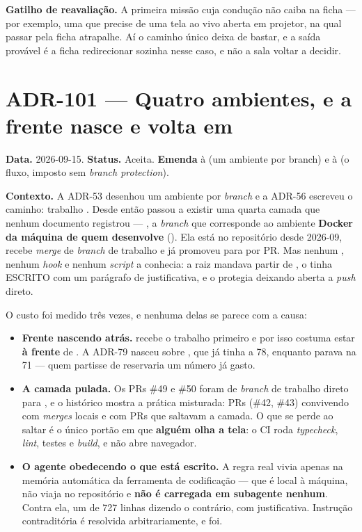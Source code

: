 \textbf{Gatilho de reavaliação.} A primeira missão cuja condução não caiba na
ficha --- por exemplo, uma que precise de uma tela ao vivo aberta em projetor, na
qual passar pela ficha atrapalhe. Aí o caminho único deixa de bastar, e a saída
provável é a ficha redirecionar sozinha nesse caso, e não a sala voltar a
decidir.


\section{ADR-101 --- Quatro ambientes, e a frente nasce e volta em }
\label{adr:quatro-ambientes}

\textbf{Data.} 2026-09-15. \textbf{Status.} Aceita.
\textbf{Emenda} à  (um ambiente por branch) e à 
(o fluxo, imposto sem \emph{branch protection}).

\textbf{Contexto.} A ADR-53 desenhou um ambiente por \emph{branch} e a ADR-56
escreveu o caminho: trabalho \seta{}  \seta{}  \seta{}
. Desde então passou a existir uma quarta camada que nenhum documento
registrou --- , a \emph{branch} que corresponde ao ambiente
\textbf{Docker da máquina de quem desenvolve} (). Ela está
no repositório desde 2026-09, recebe \emph{merge} de \emph{branch} de trabalho
e já promoveu para  por PR. Mas nenhum , nenhum
\emph{hook} e nenhum \emph{script} a conhecia: a raiz mandava partir de
, o  tinha  ESCRITO com
um parágrafo de justificativa, e o  protegia
 deixando  aberta a \emph{push} direto.

O custo foi medido três vezes, e nenhuma delas se parece com a causa:

\begin{itemize}
  \item \textbf{Frente nascendo atrás.}  recebe o trabalho
    primeiro e por isso costuma estar \textbf{à frente} de . A ADR-79
    nasceu sobre , que já tinha a 78, enquanto  parava na
    71 --- quem partisse de  reservaria um número já gasto.
  \item \textbf{A camada pulada.} Os PRs \#49 e \#50 foram de \emph{branch} de
    trabalho direto para , e o histórico mostra a prática misturada:
    PRs  (\#42, \#43) convivendo com \emph{merges}
    locais e com PRs que saltavam a camada. O que se perde ao saltar é o único
    portão em que \textbf{alguém olha a tela}: o CI roda \emph{typecheck},
    \emph{lint}, testes e \emph{build}, e não abre navegador.
  \item \textbf{O agente obedecendo o que está escrito.} A regra real vivia
    apenas na memória automática da ferramenta de codificação --- que é local à
    máquina, não viaja no repositório e \textbf{não é carregada em subagente
    nenhum}. Contra ela, um  de 727 linhas dizendo o contrário,
    com justificativa. Instrução contraditória é resolvida arbitrariamente, e
    foi.
\end{itemize}

